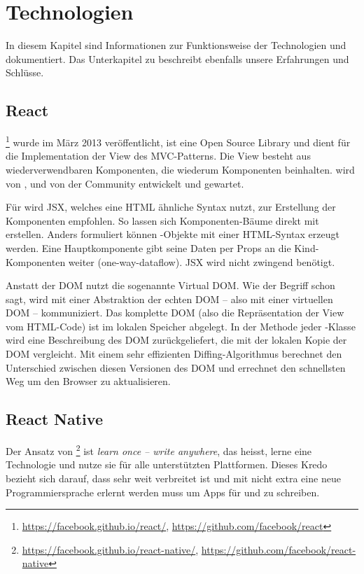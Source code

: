 \chapter{Technologien}
\label{pd-technologien}
In diesem Kapitel sind Informationen zur Funktionsweise der Technologien  und  dokumentiert. 
Das Unterkapitel zu  beschreibt ebenfalls unsere Erfahrungen und Schlüsse.


\section{React} 
\footnote{\url{https://facebook.github.io/react/}, \url{https://github.com/facebook/react}} wurde im März 2013 veröffentlicht\cite{react-release}, ist eine Open Source  \gls{Library} und dient für die Implementation der View des \gls{MVC}-Patterns. 
Die View besteht aus wiederverwendbaren Komponenten, die wiederum Komponenten beinhalten.
 wird von ,  und von der Community entwickelt und gewartet.\cite{react}

Für  wird \gls{JSX}, welches eine HTML ähnliche Syntax nutzt, zur Erstellung der Komponenten empfohlen. 
So lassen sich Komponenten-Bäume direkt mit  erstellen. 
Anders formuliert können -Objekte mit einer HTML-Syntax erzeugt werden. 
Eine Hauptkomponente gibt seine Daten per Props an die Kind-Komponenten weiter (one-way-dataflow).\cite{react-data-flow}
\gls{JSX} wird nicht zwingend benötigt.\cite{jsx-syntax}

Anstatt der \gls{DOM} nutzt  die sogenannte \gls{Virtual DOM}.
Wie der Begriff schon sagt, wird mit einer Abstraktion der echten \gls{DOM} -- also mit einer virtuellen DOM -- kommuniziert.
Das komplette \gls{DOM} (also die Repräsentation der View vom HTML-Code) ist im lokalen Speicher abgelegt.\cite{virtual-dom}
In der  Methode jeder -Klasse wird eine Beschreibung des DOM zurückgeliefert, die  mit der lokalen Kopie der \gls{DOM} vergleicht.
Mit einem sehr effizienten Diffing-Algorithmus berechnet  den Unterschied zwischen diesen  Versionen des \gls{DOM} und errechnet den schnellsten Weg um den Browser zu aktualisieren.\cite{react-virtual-dom}


\section{React Native}
Der Ansatz von \footnote{\url{https://facebook.github.io/react-native/}, \url{https://github.com/facebook/react-native}} ist \textit{learn once -- write anywhere}, das heisst, lerne eine Technologie und nutze sie für alle unterstützten Plattformen.\cite{react-native}
Dieses Kredo bezieht sich darauf, dass  sehr weit verbreitet ist und mit  nicht extra eine neue Programmiersprache erlernt werden muss um Apps für  und  zu schreiben.

